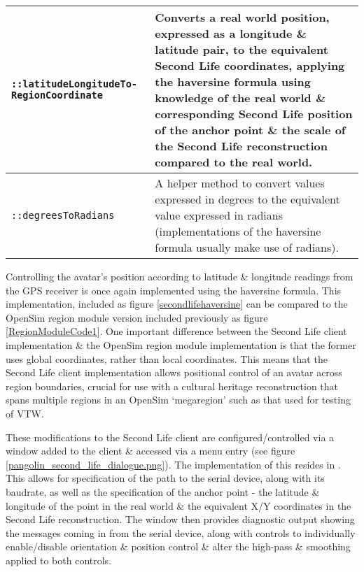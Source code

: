 \begin{center}
\begin{longtable}{| p{4.2cm} | p{10cm} |}
\hline


\texttt{::latitudeLongitudeTo- RegionCoordinate} & Converts a real world position, expressed as a longitude \& latitude pair, to the equivalent Second Life coordinates, applying the haversine formula using knowledge of the real world \& corresponding Second Life position of the anchor point \& the scale of the Second Life reconstruction compared to the real world. \\
		
\hline


\texttt{::degreesToRadians} & A helper method to convert values expressed in degrees to the equivalent value expressed in radians (implementations of the haversine formula usually make use of radians). \\
		
\hline


\end{longtable}
\end{center}


Controlling the avatar's position according to latitude \& longitude readings from the GPS receiver is once again implemented using the haversine formula. This implementation, included as figure \ref{secondlifehaversine} can be compared to the OpenSim region module version included previously as figure \ref{RegionModuleCode1}. One important difference between the Second Life client implementation \& the OpenSim region module implementation is that the former uses global coordinates, rather than local coordinates\regionmodulelimitationFootnote{}. This means that the Second Life client implementation allows positional control of an avatar across region boundaries, crucial for use with a cultural heritage reconstruction that spans multiple regions in an OpenSim `megaregion'\megaregionFootnote{} such as that used for testing of VTW.

These modifications to the Second Life client are configured/controlled via a window added to the client \& accessed via a menu entry (see figure \ref{pangolin_second_life_dialogue.png}). The implementation of this resides in . This allows for specification of the path to the serial device, along with its baudrate, as well as the specification of the anchor point - the latitude \& longitude of the point in the real world \& the equivalent X/Y coordinates in the Second Life reconstruction. The window then provides diagnostic output showing the messages coming in from the serial device, along with controls to individually enable/disable orientation \& position control \& alter the high-pass \& smoothing applied to both controls.

